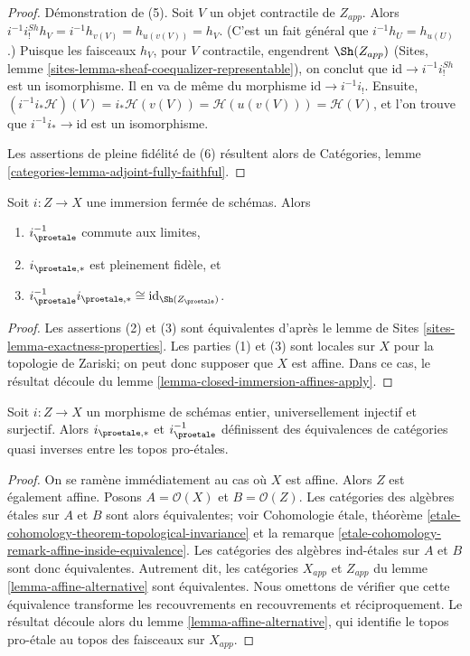 \begin{proof}
\medskip\noindent
Démonstration de (5). Soit $V$ un objet contractile de $Z_{app}$.
Alors $i^{-1}i^{Sh}_!h_V = i^{-1}h_{v(V)} = h_{u(v(V))} = h_V$.
(C'est un fait général que $i^{-1}h_U = h_{u(U)}$.) Puisque les
faisceaux $h_V$, pour $V$ contractile, engendrent $\Sh(Z_{app})$
(Sites, lemme \ref{sites-lemma-sheaf-coequalizer-representable}),
on conclut que $\text{id} \to i^{-1}i^{Sh}_!$ est un isomorphisme.
Il en va de même du morphisme $\text{id} \to i^{-1}i_!$. Ensuite,
$(i^{-1}i_*\mathcal{H})(V) = i_*\mathcal{H}(v(V)) =
\mathcal{H}(u(v(V))) = \mathcal{H}(V)$, et l'on trouve que
$i^{-1}i_* \to \text{id}$ est un isomorphisme.

\medskip\noindent
Les assertions de pleine fidélité de (6) résultent alors de
Catégories, lemme \ref{categories-lemma-adjoint-fully-faithful}.
\end{proof}

\begin{lemma}
\label{lemma-closed-immersion}
Soit $i : Z \to X$ une immersion fermée de schémas. Alors
\begin{enumerate}
\item $i_\proetale^{-1}$ commute aux limites,
\item $i_{\proetale, *}$ est pleinement fidèle, et
\item $i_\proetale^{-1}i_{\proetale, *} \cong \text{id}_{\Sh(Z_\proetale)}$.
\end{enumerate}
\end{lemma}

\begin{proof}
Les assertions (2) et (3) sont équivalentes d'après le
lemme de Sites \ref{sites-lemma-exactness-properties}.
Les parties (1) et (3) sont locales sur $X$ pour la topologie de Zariski; on peut donc supposer que
$X$ est affine. Dans ce cas, le résultat découle du
lemme \ref{lemma-closed-immersion-affines-apply}.
\end{proof}

\begin{lemma}
\label{lemma-thickening}
Soit $i : Z \to X$ un morphisme de schémas entier, universellement injectif et surjectif.
Alors
$i_{\proetale, *}$ et $i_\proetale^{-1}$ définissent des équivalences de catégories
quasi inverses entre les topos pro-\'etales.
\end{lemma}

\begin{proof}
On se ramène immédiatement au cas où $X$ est affine.
Alors $Z$ est également affine. Posons $A = \mathcal{O}(X)$ et $B = \mathcal{O}(Z)$.
Les catégories des algèbres \'etales sur
$A$ et $B$ sont alors équivalentes; voir 
Cohomologie \'etale, théorème
\ref{etale-cohomology-theorem-topological-invariance} et la
remarque \ref{etale-cohomology-remark-affine-inside-equivalence}.
Les catégories des algèbres ind-\'etales sur $A$ et $B$ sont donc
équivalentes. Autrement dit, les catégories $X_{app}$ et $Z_{app}$
du lemme \ref{lemma-affine-alternative} sont équivalentes.
Nous omettons de vérifier
que cette équivalence transforme les recouvrements en recouvrements et réciproquement.
Le résultat découle alors du lemme \ref{lemma-affine-alternative},
qui identifie le topos pro-\'etale au topos des faisceaux sur $X_{app}$.
\end{proof}

